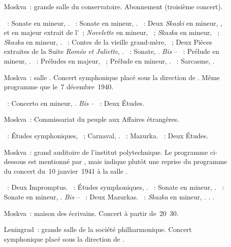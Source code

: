 \begin{description}
 \item[]
 Moskva~: grande salle du conservatoire.
 Abonnement  (troisième concert).

 \textsc{\Beethoven{}}~: Sonate en \kC \Sharp mineur,  .
 \textsc{\Chopin{}}~: Sonate en \kB \Flat mineur, .
 \textsc{\Medtner{}}~: Deux \emph{Skazki} en \kF mineur, 
 , et en \kE \Flat majeur extrait de l'~;
 \emph{Novelette} en \kC mineur,  ~; \emph{Skazka} en \kE
 mineur,  ~; \emph{Skazka} en \kB mineur, 
 .
 \textsc{\Prokofiev{}}~: Contes de la vieille grand-mère, ~; Deux
 Pièces extraites de la Suite \emph{Roméo et Juliette}, .
 \textsc{\Scriabine{}}~: Sonate, .
 \emph{Bis} -- \textsc{\Scriabine{}}~: Prélude en \kG mineur, 
 .
 \textsc{\Rachmaninov{}}~: Préludes en \kG majeur,  ~;
 Prélude en \kG \Sharp mineur,  .
 \textsc{\Prokofiev{}}~: Sarcasme,  .
 \item[]
 Moskva~: salle \Tchaikovski{}.
 Concert symphonique placé sous la direction de \IMiklashevsky{}.
 Même programme que le~7 décembre~1940.

 \textsc{\Scriabine{}}~: Concerto en \kF \Sharp mineur, .
 \emph{Bis} -- \textsc{\Scriabine{}}~: Deux Études.
 \item[]
 Moskva~: Commissariat du peuple aux Affaires étrangères.

 \textsc{\Schumann{}}~: Études symphoniques, ~; Carnaval, .
 \textsc{\Chopin{}}~: Mazurka.
 \textsc{\Scriabine{}}~: Deux Études.
 \item[]
 Moskva~: grand auditoire de l'institut polytechnique.
 Le programme ci-dessous est mentionné par \citet[p.~417]{Scriabine}, mais
 \citet[p.~163]{Nekrasova08} indique plutôt une reprise du programme du
 concert du~10 janvier~1941 à la salle \Tchaikovski{}.

 \textsc{\Schubert{}}~: Deux Impromptus.
 \textsc{\Schumann{}}~: Études symphoniques, .
 \textsc{\Beethoven{}}~: Sonate en \kC \Sharp mineur,  .
 \textsc{\Chopin{}}~: Sonate en \kB \Flat mineur, .
 \emph{Bis} -- \textsc{\Chopin{}}~: Deux Mazurkas.
 \textsc{\Medtner{}}~: \emph{Skazka} en \kF mineur,  .
 \textsc{\Scriabine{}}.
 \textsc{\Schumann{}}.
 \item[]
 Moskva~: maison des écrivains.
 Concert à partir de~20~30.
 \item[]
 Leningrad~: grande salle de la société philharmonique.
 Concert symphonique placé sous la direction de \IMiklashevsky{}.


\end{description}
